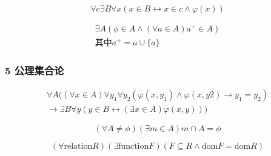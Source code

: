 \documentclass{beamer}
\begin{document}
\begin{CJK*}{UTF8}{gbsn}
\begin{frame}
\begin{Ax}[幂集公理]
\begin{equation*}
    \end{equation*}
  \end{Ax}
  \begin{Ax}[子集公理]
    \begin{equation*}
      \forall c \exists B \forall x (x \in B \leftrightarrow x \in c \land \varphi(x))
    \end{equation*}
  \end{Ax}
  \begin{Ax}[无穷公理]
    \begin{equation*}
      \begin{split}
      \exists A ( \phi \in A \land (\forall a \in A) a^+ \in A)\\
      \text{其中} a^+ = a \cup \{a\}
      \end{split}
    \end{equation*}
  \end{Ax}
\end{frame}

\begin{frame}
  \frametitle{5 公理集合论}
    \begin{Ax}[代换公理]
    \begin{equation*}
      \begin{split}
      \forall A ((\forall x \in A) \forall y_1 \forall y_2 (\varphi(x, y_1) \land \varphi(x, y2) \rightarrow y_1 = y_2)\\
      \rightarrow \exists B \forall y (y \in B \leftrightarrow (\exists x \in A) \varphi(x, y)))
    \end{split}
  \end{equation*}
  \end{Ax}
  \begin{Ax}[正则公理]
    \begin{equation*}
      (\forall A \neq \phi) (\exists m \in A) m \cap A = \phi
    \end{equation*}
  \end{Ax}
  \begin{Ax}[选择公理]
    \begin{equation*}
      (\forall \text{relation} R)
      (\exists \text{function} F)
      (F \subseteq R \land
      \text{dom} F
      = \text{dom} R)
    \end{equation*}
  \end{Ax}
\end{frame}


\end{CJK*}
\end{document}
